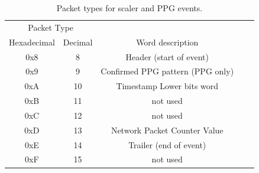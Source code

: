 \documentclass[letterpaper,12pt,notitlepage]{report}
\begin{document}
\begin{table}[h]
\begin{center}
\begin{tabular}{ccccc}
\hline
\hline
\multicolumn{2}{c}{Packet Type}\\
Hexadecimal & Decimal & Word description\\
\hline
0x8 & 8 & Header (start of event)\\
0x9 & 9 & Confirmed PPG pattern (PPG only) \\
0xA & 10 & Timestamp Lower bits word\\
0xB & 11 & not used\\
0xC & 12 & not used\\
0xD & 13 & Network Packet Counter Value\\
0xE & 14 & Trailer (end of event)\\
0xF & 15 & not used\\
\hline
\hline
\end{tabular}
\label{table.packettypes_other}
\caption{Packet types for scaler and PPG events.}
\end{center}
\end{table}
\end{document}
